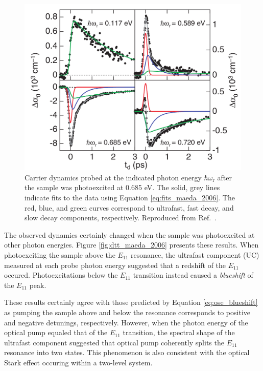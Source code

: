 \begin{figure}[H]
	\centering
	\includegraphics[scale=1.2]{images/chapter_prior_works/dtt_2_maeda_2006}
	\caption{Carrier dynamics probed at the indicated photon energy $\hbar \omega_\text{r}$ after the sample was photoexcited at 0.685 eV. The solid, grey lines indicate fits to the data using Equation \eqref{eq:fits_maeda_2006}. The red, blue, and green curves correspond to ultrafast, fast decay, and slow decay components, respectively. Reproduced from Ref.\ \cite{maeda2006gigantic}.}
	\label{fig:dtt_2_maeda_2006}
\end{figure}

The observed dynamics certainly changed when the sample was photoexcited at other photon energies. Figure \ref{fig:dtt_maeda_2006} presents these results. When photoexciting the sample above the $E_{11}$ resonance, the ultrafast component (UC) measured at each probe photon energy suggested that a redshift of the $E_{11}$ occured. Photoexcitations below the $E_{11}$ transition instead caused a \textit{blueshift} of the $E_{11}$ peak.

These results certainly agree with those predicted by Equation \eqref{eq:ose_blueshift} as pumping the sample above and below the resonance corresponds to positive and negative detunings, respectively. However, when the photon energy of the optical pump equaled that of the $E_{11}$ transition, the spectral shape of the ultrafast component suggested that optical pump coherently splits the $E_{11}$ resonance into two states. This phenomenon is also consistent with the optical Stark effect occuring within a two-level system.

